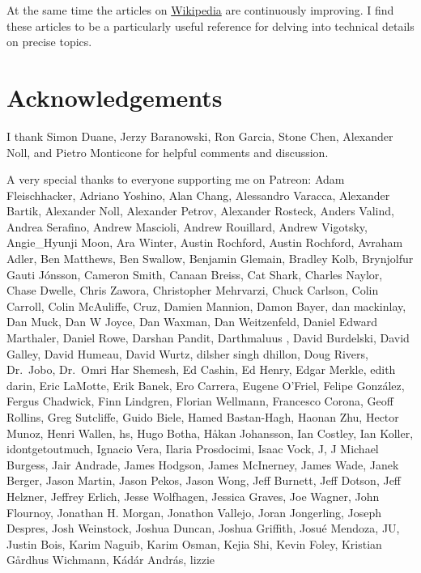 \documentclass[
  letterpaper,
  DIV=11,
  numbers=noendperiod]{scrartcl}
\begin{document}
At the same time the articles on
\href{https://en.wikipedia.org/wiki/Mathematics}{Wikipedia} are
continuously improving. I find these articles to be a particularly
useful reference for delving into technical details on precise topics.

\hypertarget{acknowledgements}{%
\section*{Acknowledgements}\label{acknowledgements}}

I thank Simon Duane, Jerzy Baranowski, Ron Garcia, Stone Chen, Alexander
Noll, and Pietro Monticone for helpful comments and discussion.

A very special thanks to everyone supporting me on Patreon: Adam
Fleischhacker, Adriano Yoshino, Alan Chang, Alessandro Varacca,
Alexander Bartik, Alexander Noll, Alexander Petrov, Alexander Rosteck,
Anders Valind, Andrea Serafino, Andrew Mascioli, Andrew Rouillard,
Andrew Vigotsky, Angie\_Hyunji Moon, Ara Winter, Austin Rochford, Austin
Rochford, Avraham Adler, Ben Matthews, Ben Swallow, Benjamin Glemain,
Bradley Kolb, Brynjolfur Gauti Jónsson, Cameron Smith, Canaan Breiss,
Cat Shark, Charles Naylor, Chase Dwelle, Chris Zawora, Christopher
Mehrvarzi, Chuck Carlson, Colin Carroll, Colin McAuliffe, Cruz, Damien
Mannion, Damon Bayer, dan mackinlay, Dan Muck, Dan W Joyce, Dan Waxman,
Dan Weitzenfeld, Daniel Edward Marthaler, Daniel Rowe, Darshan Pandit,
Darthmaluus , David Burdelski, David Galley, David Humeau, David Wurtz,
dilsher singh dhillon, Doug Rivers, Dr.~Jobo, Dr.~Omri Har Shemesh, Ed
Cashin, Ed Henry, Edgar Merkle, edith darin, Eric LaMotte, Erik Banek,
Ero Carrera, Eugene O'Friel, Felipe González, Fergus Chadwick, Finn
Lindgren, Florian Wellmann, Francesco Corona, Geoff Rollins, Greg
Sutcliffe, Guido Biele, Hamed Bastan-Hagh, Haonan Zhu, Hector Munoz,
Henri Wallen, hs, Hugo Botha, Håkan Johansson, Ian Costley, Ian Koller,
idontgetoutmuch, Ignacio Vera, Ilaria Prosdocimi, Isaac Vock, J, J
Michael Burgess, Jair Andrade, James Hodgson, James McInerney, James
Wade, Janek Berger, Jason Martin, Jason Pekos, Jason Wong, Jeff Burnett,
Jeff Dotson, Jeff Helzner, Jeffrey Erlich, Jesse Wolfhagen, Jessica
Graves, Joe Wagner, John Flournoy, Jonathan H. Morgan, Jonathon Vallejo,
Joran Jongerling, Joseph Despres, Josh Weinstock, Joshua Duncan, Joshua
Griffith, Josué Mendoza, JU, Justin Bois, Karim Naguib, Karim Osman,
Kejia Shi, Kevin Foley, Kristian Gårdhus Wichmann, Kádár András, lizzie
\end{document}

